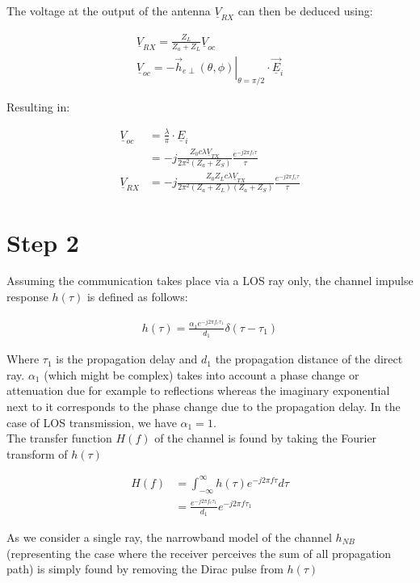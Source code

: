 \documentclass[10pt,a4paper]{ULBreport}
\begin{document}
The voltage at the output of the antenna $\underline{V}_{RX}$ can then be deduced using:

\begin{align*}
    \underline{V}_{RX} = \frac{Z_L}{Z_a + Z_L} \underline{V}_{oc}\\
    \underline{V}_{oc} = -\left . \vec{h}_{e\perp}(\theta, \phi)\right\vert_{\theta = \pi/2} \cdot \underline{\vec{E}}_i
\end{align*}

Resulting in:

\begin{align*}
    \underline{V}_{oc} &= \frac{\lambda}{\pi} \cdot \underline{E}_i\\
    &= -j\frac{Z_0 c \lambda \underline{V}_{TX}}{2\pi^2 (Z_a + Z_S)}\frac{e^{-j 2\pi f_c \tau}}{\tau}\\
    \underline{V}_{RX} &= -j\frac{Z_0 Z_L c \lambda \underline{V}_{TX}}{2\pi^2 (Z_a + Z_L) (Z_a+Z_S)}\frac{e^{-j 2\pi f_c \tau}}{\tau}
\end{align*}

\section{Step 2}

Assuming the communication takes place via a LOS ray only, the channel impulse response $h(\tau)$ is defined as follows:

\begin{align*}
    h(\tau) = \frac{\alpha_1 e^{-j2\pi f_c \tau_1}}{d_1} \delta(\tau - \tau_1)
\end{align*}

Where $\tau_1$ is the propagation delay and $d_1$ the propagation distance of the direct ray. $\alpha_1$ (which might be complex) takes into account a phase change or attenuation due for example to reflections whereas the imaginary exponential next to it corresponds to the phase change due to the propagation delay. In the case of LOS transmission, we have $\alpha_1 = 1$.\\
The transfer function $H(f)$ of the channel is found by taking the Fourier transform of $h(\tau)$

\begin{align*}
    H(f) &= \int_{-\infty}^{\infty} h(\tau) e^{-j2\pi f \tau} d\tau\\
    &= \frac{e^{-j2\pi f_c \tau_1}}{d_1}e^{-j2\pi f \tau_1}
\end{align*}

As we consider a single ray, the narrowband model of the channel $h_{NB}$ (representing the case where the receiver perceives the sum of all propagation path) is simply found by removing the Dirac pulse from $h(\tau)$
\end{document}

